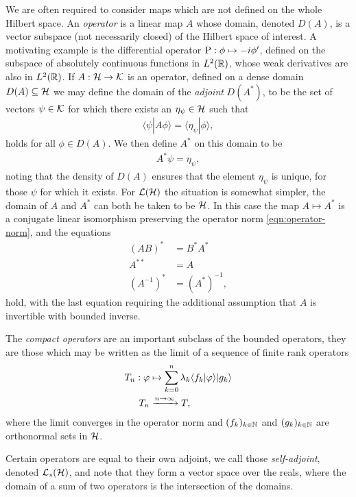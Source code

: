 We are often required to consider maps which are not defined on the whole Hilbert space. An \emph{operator} is a linear map $A$ whose domain, denoted $D(A)$, is a vector subspace (not necessarily closed) of the Hilbert space of interest. A motivating example is the differential operator $\operatorname{P}:\phi\mapsto -i \phi^\prime$, defined on the subspace of absolutely continuous functions in $L^2(\mathbb{R})$, whose weak derivatives are also in $L^2(\mathbb{R})$. If $A:\mathcal{H}\to\mathcal{K}$ is an operator, defined on a dense domain $D(A)\subseteq \mathcal{H}$ we may define the domain of the \emph{adjoint} $D(A^*)$, to be the set of vectors $\psi \in \mathcal{K}$ for which there exists an $\eta_{\psi}\in \mathcal{H}$ such that
\begin{align}
  \langle \psi | A\phi \rangle  = \langle \eta_{\psi}| \phi\rangle,
\end{align}
holds for all $\phi\in D(A)$. We then define $A^*$ on this domain to be
\begin{align}
  A^* \psi = \eta_{\psi},
\end{align}
noting that the density of $D(A)$ ensures that the element $\eta_{\psi}$ is unique, for those $\psi$ for which it exists. For $\bops[\hcal]$ the situation is somewhat simpler, the domain of $A$ and $A^*$ can both be taken to be $\mathcal{H}$. In this case the map $A\mapsto A^*$ is a conjugate linear isomorphism preserving the operator norm \eqref{eqn:operator-norm}, and the equations
\begin{align}
  (AB)^* &= B^* A^*\\
  A^{**} &= A\\
  \left(A^{-1}\right)^* &= \left(A^*\right)^{-1},
\end{align}
hold, with the last equation requiring the additional assumption that $A$ is invertible with bounded inverse. 

The \emph{compact operators} are an important subclass of the bounded operators, they are those which may be written as the limit of a sequence of finite rank operators
\begin{align}
  T_n:\varphi&\mapsto\sum_{k=0}^n \lambda_k\langle f_k|\varphi\rangle | g_k \rangle \\
  T_n &\xrightarrow{n\to\infty} T,
\end{align}
where the limit converges in the operator norm and $(f_k)_{k\in \mathbb{N}}$ and $(g_k)_{k\in \mathbb{N}}$ are orthonormal sets in $\mathcal{H}$.

Certain operators are equal to their own adjoint, we call those \emph{self-adjoint}, denoted $\saops[\hcal]$, and note that they form a vector space over the reals, where the domain of a sum of two operators is the intersection of the domains. 

